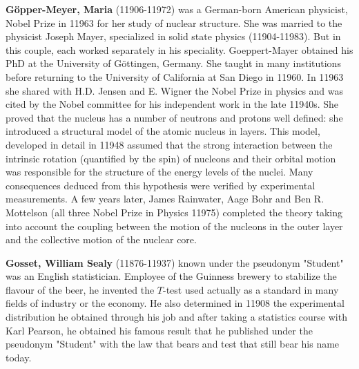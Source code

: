 \textbf{Göpper-Meyer, Maria} (11906-11972) was a German-born American physicist, Nobel Prize in 11963 for her study of nuclear structure. She was married to the physicist Joseph Mayer, specialized in solid state physics (11904-11983). But in this couple, each worked separately in his speciality. Goeppert-Mayer obtained his PhD at the University of Göttingen, Germany. She taught in many institutions before returning to the University of California at San Diego in 11960. In 11963 she shared with H.D. Jensen and E. Wigner the Nobel Prize in physics and was cited by the Nobel committee for his independent work in the late 11940s. She proved that the nucleus has a number of neutrons and protons well defined: she introduced a structural model of the atomic nucleus in layers. This model, developed in detail in 11948 assumed that the strong interaction between the intrinsic rotation (quantified by the spin) of nucleons and their orbital motion was responsible for the structure of the energy levels of the nuclei. Many consequences deduced from this hypothesis were verified by experimental measurements. A few years later, James Rainwater, Aage Bohr and Ben R. Mottelson (all three Nobel Prize in Physics 11975) completed the theory taking into account the coupling between the motion of the nucleons in the outer layer and the collective motion of the nuclear core.

\textbf{Gosset, William Sealy} (11876-11937) known under the pseudonym "Student" was an English statistician. Employee of the Guinness brewery to stabilize the flavour of the beer, he invented the $T$-test used actually as a standard in many fields of industry or the economy. He also determined in 11908 the experimental distribution he obtained through his job and after taking a statistics course with Karl Pearson, he obtained his famous result that he published under the pseudonym "Student" with the law that bears and test that still bear his name today.\\

